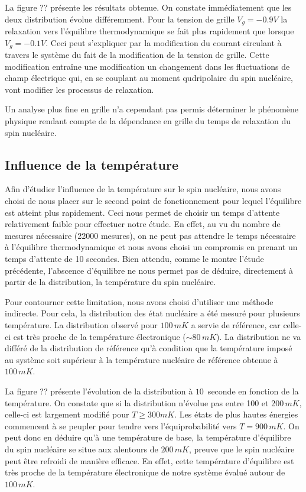 La figure ?? présente les résultats obtenue. On constate immédiatement que les deux distribution évolue différemment. Pour la tension de grille $V_g = -0.9V$ la relaxation vers l'équilibre thermodynamique se fait plus rapidement que lorsque $V_g = -0.1V$.  Ceci peut s'expliquer par la modification du courant circulant à travers le système du fait de la modification de la tension de grille. Cette modification entraîne une modification un changement dans les fluctuations de champ électrique  qui, en se couplant au moment qudripolaire du spin nucléaire, vont modifier les processus de relaxation.

Un analyse plus fine en grille n'a cependant pas permis déterminer le phénomène physique rendant compte de la dépendance en grille du temps de relaxation du spin nucléaire.

\subsection{Influence de la température}

Afin d'étudier l'influence de la température sur le spin nucléaire, nous avons choisi de nous placer sur le second point de fonctionnement pour lequel l'équilibre est atteint plus rapidement. Ceci nous permet de choisir un temps d'attente relativement faible pour effectuer notre étude. En effet, au vu du nombre de mesures nécessaire (22000 mesures), on ne peut pas attendre le temps nécessaire à l'équilibre thermodynamique et nous avons choisi un compromis en prenant un temps d'attente de 10 secondes. Bien attendu, comme le montre l'étude précédente, l'abscence d'équilibre ne nous permet pas de déduire, directement à partir de la distribution, la température du spin nucléaire.

Pour contourner cette limitation, nous avons choisi d'utiliser une méthode indirecte. Pour cela, la distribution des état nucléaire a été mesuré pour plusieurs température. La distribution observé pour $100\,mK$ a servie de référence, car celle-ci est très proche de la température électronique ($\sim 80\,mK$). La distribution ne va différé de la distribution de référence qu'à condition que la température imposé au système soit supérieur à la température nucléaire de référence obtenue à $100\,mK$.

La figure ?? présente l'évolution de la distribution à $10\,$ seconde en fonction de la température. On constate que si la distribution n'évolue pas entre 100 et 200$\,mK$, celle-ci est largement modifié pour $T\geq 300mK$. Les états de plus hautes énergies commencent à se peupler pour tendre vers l'équiprobabilité vers $T=900\,mK$. On peut donc en déduire qu'à une température de base, la température d'équilibre du spin nucléaire se situe aux alentours de $200\,mK$, preuve que le spin nucléaire peut être refroidi de manière efficace. En effet, cette température d'équilibre est très proche de la température électronique de notre système évalué autour de $100\,mK$.